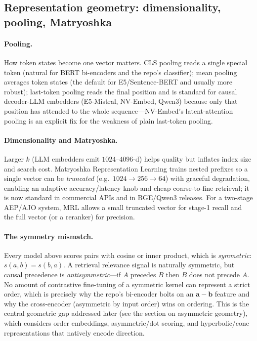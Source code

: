 \subsection{Representation geometry: dimensionality, pooling, Matryoshka}
\label{sec:emb:geometry}

\paragraph{Pooling.} How token states become one vector matters. CLS pooling reads a
single special token (natural for BERT bi-encoders and the repo's classifier); mean
pooling averages token states (the default for E5/Sentence-BERT and usually more
robust); last-token pooling reads the final position and is standard for causal
decoder-LLM embedders (E5-Mistral, NV-Embed, Qwen3) because only that position has
attended to the whole sequence---NV-Embed's latent-attention pooling is an explicit
fix for the weakness of plain last-token pooling.

\paragraph{Dimensionality and Matryoshka.} Larger $k$ (LLM embedders emit
$1024$--$4096$-d) helps quality but inflates index size and search cost. Matryoshka
Representation Learning \citep{emb:kusupati2022matryoshka} trains nested prefixes so a
single vector can be \emph{truncated} (e.g.\ $1024\!\to\!256\!\to\!64$) with graceful
degradation, enabling an adaptive accuracy/latency knob and cheap coarse-to-fine
retrieval; it is now standard in commercial APIs and in BGE/Qwen3 releases. For a
two-stage AEP/AJO system, MRL allows a small truncated vector for stage-1 recall and
the full vector (or a reranker) for precision.

\paragraph{The symmetry mismatch.} Every model above scores pairs with cosine or inner
product, which is \emph{symmetric}: $s(a,b)=s(b,a)$. A retrieval relevance signal is
naturally symmetric, but causal precedence is \emph{antisymmetric}---if $A$ precedes
$B$ then $B$ does not precede $A$. No amount of contrastive fine-tuning of a symmetric
kernel can represent a strict order, which is precisely why the repo's bi-encoder bolts
on an $\mathbf{a}{-}\mathbf{b}$ feature and why the cross-encoder (asymmetric by
input order) wins on ordering. This is the central geometric gap addressed later (see
the section on asymmetric geometry), which considers order embeddings, asymmetric/dot
scoring, and hyperbolic/cone representations that natively encode direction.

